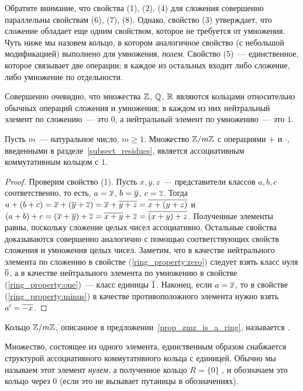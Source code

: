 Обратите внимание, что свойства (1), (2), (4) для сложения совершенно
параллельны свойствам (6), (7), (8). Однако, свойство (3) утверждает,
что сложение обладает еще одним свойством, которое не требуется от
умножения. Чуть ниже мы назовем кольцо, в котором аналогичное свойство
(с небольшой модификацией) выполнено для умножения, {\it
  полем}. Свойство (5)~--- единственное, которое связывает две
операции; в каждое из остальных входит либо сложение, либо умножение
по отдельности.

\begin{examples}\label{examples:rings}
Совершенно очевидно, что множества $\mathbb Z$, $\mathbb Q$, $\mathbb R$ являются
кольцами относительно обычных операций сложения и умножения;
в каждом из них нейтральный элемент по сложению~--- это $0$, а
нейтральный элемент по умножению~--- это $1$.
\end{examples}

\begin{proposition}\label{prop_zmz_is_a_ring}
Пусть $m$~--- натуральное число, $m\geq 1$.
Множество $\mathbb Z/m\mathbb Z$ с операциями $+$ и $\cdot$, введенными в
разделе~\ref{subsect_residues}, является ассоциативным коммутативным
кольцом с $1$.
\end{proposition}
\begin{proof}
Проверим свойство (1).
Пусть $x,y,z$~--- представители классов $a,b,c$ соответственно,
то есть, $a=\overline{x}$, $b=\overline{y}$, $c=\overline{z}$. Тогда
$a+(b+c)=\overline{x}+(\overline{y}+\overline{z})=\overline{x}+\overline{y+z}=\overline{x+(y+z)}$ и
$(a+b)+c=(\overline{x}+\overline{y})+\overline{z}=\overline{x+y}+\overline{z}=\overline{(x+y)+z}$. Полученные
элементы равны, поскольку сложение целых чисел ассоциативно.
Остальные свойства доказываются совершенно аналогично с помощью
соответствующих свойств сложения и умножения целых чисел. Заметим, что
в качестве нейтрального элемента по сложению в свойстве
(\ref{ring_property:zero}) следует взять класс нуля
$\overline{0}$, а в качестве нейтрального элемента по умножению в свойстве
(\ref{ring_property:one})~--- класс единицы $\overline{1}$.
Наконец, если $a=\overline{x}$, то в свойстве (\ref{ring_property:minus}) в
качестве противоположного элемента нужно взять $a'=\overline{-x}$.
\end{proof}

\begin{definition}
Кольцо $\mathbb Z/m\mathbb Z$, описанное в
предложении~\ref{prop_zmz_is_a_ring}, называется .
\end{definition}

\begin{definition}
Множество, состоящее из одного элемента, единственным образом
снабжается структурой ассоциативного коммутативного кольца с
единицей. Обычно мы называем этот элемент {\it нулем}, а полученное
кольцо $R = \{0\}$ , и
обозначаем это кольцо
через $0$ (если это не вызывает путаницы в обозначениях).
\end{definition}

